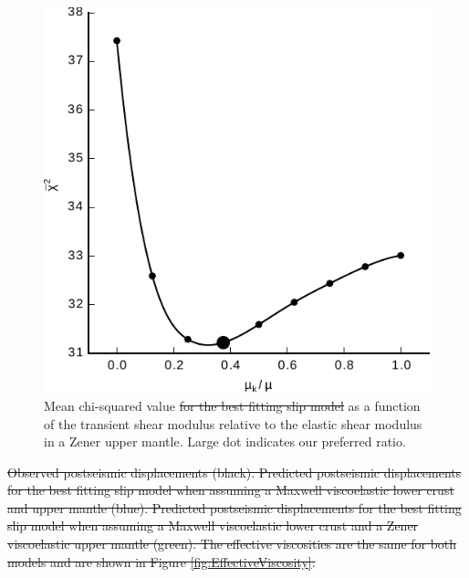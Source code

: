 \documentclass[draft,linenumbers]{AGUJournal}
\providecommand{\DIFadd}[1]{{\protect\color{blue}\uwave{#1}}} %
\providecommand{\DIFdel}[1]{{\protect\color{red}\sout{#1}}}                      %
\providecommand{\DIFdelbegin}{} %
\providecommand{\DIFaddFL}[1]{\DIFadd{#1}} %
\providecommand{\DIFdelFL}[1]{\DIFdel{#1}} %
\providecommand{\DIFaddbeginFL}{} %
\providecommand{\DIFaddendFL}{} %
\providecommand{\DIFdelbeginFL}{} %
\providecommand{\DIFdelendFL}{} %
\begin{document}
\begin{figure}
\DIFdelbeginFL %
\DIFdelendFL \DIFaddbeginFL \includegraphics[scale=0.9]{Figures/2016jb013114-f13}
\DIFaddendFL \centering 
\caption{Mean chi-squared value \DIFdelbeginFL \DIFdelFL{for the best fitting slip model }\DIFdelendFL as a function of the transient shear modulus relative to the elastic shear modulus in a Zener \DIFaddbeginFL \DIFaddFL{rheology }\DIFaddendFL upper mantle. Large dot indicates our preferred ratio.}
\label{fig:ShearModulusRatio}
\end{figure}

\DIFdelbegin %
{%
\DIFdel{Observed postseismic displacements (black). Predicted postseismic displacements for the best fitting slip model when assuming a Maxwell viscoelastic lower crust and upper mantle (blue).  Predicted postseismic displacements for the best fitting slip model when assuming a Maxwell viscoelastic lower crust and a Zener viscoelastic upper mantle (green).  The effective viscosities are the same for both models and are shown in Figure \ref{fig:EffectiveViscosity}.}}
\end{document}
